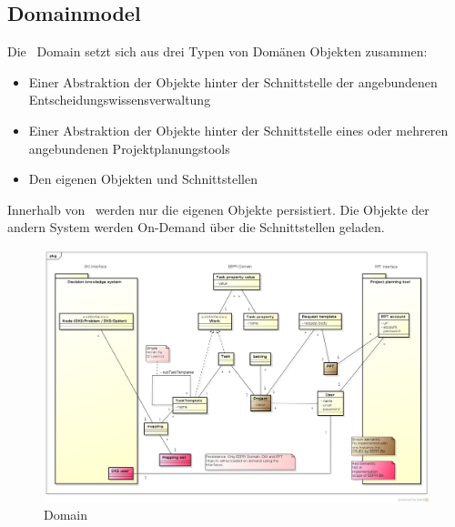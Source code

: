 	
		\subsection{Domainmodel}
			Die \eeppi\ Domain setzt sich aus drei Typen von Domänen Objekten zusammen: 
			\begin{itemize}
				\item Einer Abstraktion der Objekte hinter der Schnittstelle der angebundenen Entscheidungswissensverwaltung
				\item Einer Abstraktion der Objekte hinter der Schnittstelle eines oder mehreren angebundenen Projektplanungstools
				\item Den eigenen Objekten und Schnittstellen
			\end{itemize}
			
			Innerhalb von \eeppi\ werden nur die eigenen Objekte persistiert.
			Die Objekte der andern System werden On-Demand über die Schnittstellen geladen.
		
			\begin{landscape}
				\begin{figure}[H]
					\includegraphics[width=0.9\linewidth]{architecture/media/img/domain.png}
					\centering
					\caption{\eeppi Domain}
					\label{fig:domain}
				\end{figure}				
			\end{landscape}
			
